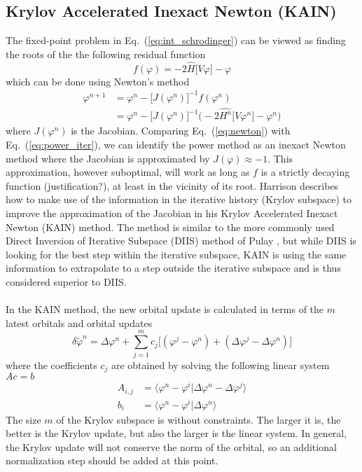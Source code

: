 \subsection{Krylov Accelerated Inexact Newton (KAIN)}
The fixed-point problem in Eq.~(\ref{eq:int_schrodinger}) can be viewed as finding 
the roots of the the following residual function
\begin{equation}
    f(\varphi) =  -2 \hat{H}\big[V\varphi\big] - \varphi
\end{equation}
which can be done using Newton's method
\begin{align}
    \varphi^{n+1}	&= \varphi^n - \big[J(\varphi^n)\big]^{-1}f(\varphi^n)\\
    \label{eq:newton}
		&= \varphi^n - \big[J(\varphi^n)\big]^{-1}\big(-2 \hat{H^n}\big[V\varphi^n\big] - \varphi^n\big)
\end{align}
where $J(\varphi^n)$ is the Jacobian. Comparing Eq.~(\ref{eq:newton}) with 
Eq.~(\ref{eq:power_iter}), we can identify the power method as an inexact 
Newton method where the Jacobian is approximated by $J(\varphi) \approx -1$.
This approximation, however suboptimal, will work as long as $f$ is a strictly 
decaying function (justification?), at least in the vicinity of its root. 
Harrison \cite{KAIN} describes how to make use of the information in the
iterative history (Krylov subspace) to improve the approximation of the 
Jacobian in his Krylov Accelerated Inexact Newton (KAIN) method. The method 
is similar to the more commonly used Direct Inversion of Iterative Subspace 
(DIIS) method of Pulay \cite{DIIS}, but while DIIS is looking for the best 
step within the iterative subspace, KAIN is using the same information to 
extrapolate to a step outside the iterative subspace and is thus considered 
superior to DIIS.
\\
\\
In the KAIN method, the new orbital update is calculated in terms of the $m$ 
latest orbitals and orbital updates
\begin{equation}
    \label{eq:KAIN_update}
    \delta \tilde{\varphi}^n = \Delta\varphi^n + \sum_{j=1}^m c_j \big[(\varphi^{j}-\varphi^{n}) + 
    (\Delta\varphi^{j}-\Delta\varphi^{n})\big] 
\end{equation}
where the coefficients $c_j$ are obtained by solving the following linear 
system $Ac=b$ 
\begin{align}
    A_{i,j} &= \langle \varphi^n -\varphi^i | \Delta\varphi^n - \Delta\varphi^j\rangle\\
    b_{i}   &= \langle \varphi^n -\varphi^i | \Delta\varphi^n\rangle
\end{align}
The size $m$ of the Krylov subspace is without constraints. The larger it is, 
the better is the Krylov update, but also the larger is the linear system. In 
general, the Krylov update will not conserve the norm of the orbital, so an 
additional normalization step should be added at this point.

